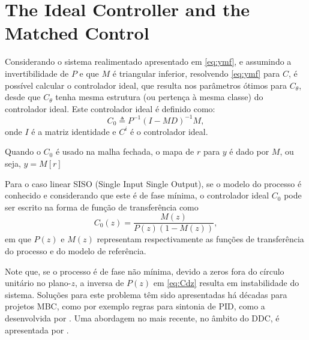 \section{The Ideal Controller and the Matched Control}%
\label{sub:the_ideal_controller_and_the_matched_control}

Considerando o sistema realimentado apresentado em \eqref{eq:ymf}, e assumindo a invertibilidade de $P$ e que $M$ é triangular inferior, resolvendo \eqref{eq:ymf} para $C$, é possível calcular o controlador ideal, que resulta nos parâmetros ótimos para $C_\theta$, desde que $C_\theta$ tenha mesma estrutura (ou pertença à mesma classe) do controlador ideal. Este controlador ideal é definido como:
\begin{equation}
   C_0 \triangleq P^{-1}(I-MD)^{-1}M,
\label{eq:}
\end{equation}
onde $I$ é a matriz identidade e $C^{i}$ é o controlador ideal.

Quando o $C_0$ é usado na malha fechada, o mapa de $r$ para $y$ é dado por $M$, ou seja, $y=M[r]$

Para o caso linear SISO (Single Input Single Output), se o modelo do processo é conhecido e considerando que este é de 
fase mínima, o controlador ideal $C_0$ pode ser escrito na forma de função de transferência como
\begin{equation}
   C_0(z) = \frac{M(z)}{P(z)\left(1-M(z)\right)},
   \label{eq:Cdz}
\end{equation}
em que $P(z)$ e $M(z)$ representam respectivamente as funções de transferência do processo e do modelo de referência.

Note que, se o processo é de fase não mínima, devido a zeros fora do círculo unitário no plano-$z$, a inversa de $P(z)$ em \eqref{eq:Cdz} resulta em instabilidade do sistema. Soluções para este problema têm sido apresentadas há décadas para projetos MBC, como por exemplo regras para sintonia de PID, como a desenvolvida por \cite{skogestad2003}.
Uma abordagem no mais recente, no âmbito do DDC, é apresentada por \cite{campestrini2011}.




